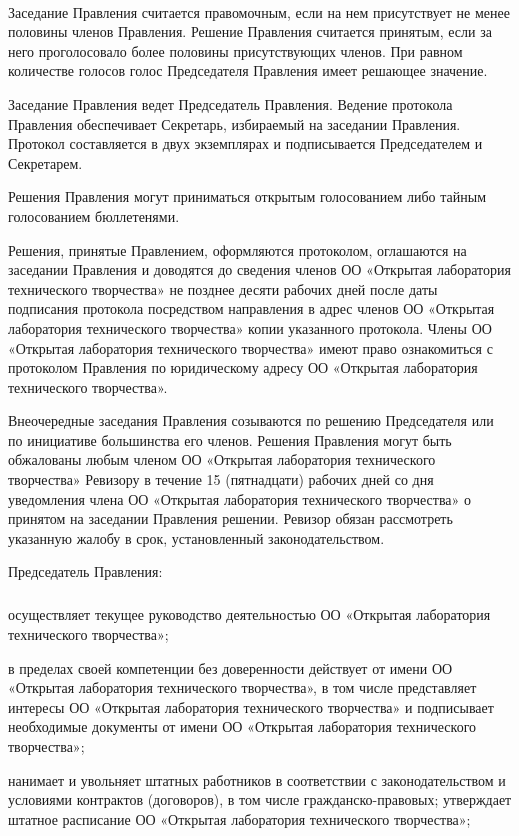 \documentclass[a4paper,fontsize=14pt,titlepage]{scrartcl}
\makeatletter
\newenvironment{numberedpars}{%
  \addtocounter{secnumdepth}{1}
  \renewcommand\theparagraph{\arabic{section}.\arabic{paragraph}}
  \renewcommand\@seccntformat[1]
  {\expandafter\ifx\csname##1\endcsname\paragraph\csname 
  the##1\endcsname\else\csname the##1\endcsname\quad\fi}
  \let\old@par=\par
  \def\new@par{\let\par=\old@par\paragraph{}\let\par=\new@par}
  \let\par=\new@par
  \par
}{
  \addtocounter{secnumdepth}{-1}
}
\newenvironment{numberedsubpars}{%
  \addtocounter{secnumdepth}{1}
  \renewcommand\thesubparagraph{\arabic{section}.\arabic{paragraph}.\arabic{subparagraph}}
  \renewcommand\@seccntformat[1]
  {\expandafter\ifx\csname##1\endcsname\subparagraph\csname 
  the##1\endcsname\else\csname the##1\endcsname\quad\fi}
  \let\old@@par=\par
  \def\new@@par{\let\par=\old@par\subparagraph{}\let\par=\new@@par}
  \let\par=\new@@par
  \par
}{
  \addtocounter{secnumdepth}{-1}
  \let\par=\old@@par
}
\makeatother
\begin{document}
\begin{numberedpars}
Заседание Правления считается правомочным, если на нем присутствует не менее половины членов Правления. Решение
Правления считается принятым, если за него проголосовало более половины присутствующих членов. При равном количестве
голосов голос Председателя Правления имеет решающее значение.

Заседание Правления ведет Председатель Правления. Ведение протокола Правления обеспечивает Секретарь, избираемый на
заседании Правления. Протокол составляется в двух экземплярах и подписывается Председателем и Секретарем. 

Решения Правления могут приниматься открытым голосованием либо тайным голосованием бюллетенями.

Решения, принятые Правлением, оформляются протоколом, оглашаются на заседании Правления и доводятся до сведения членов
ОО «Открытая лаборатория технического творчества» не позднее десяти рабочих дней после даты подписания протокола
посредством направления в адрес членов ОО «Открытая лаборатория технического творчества» копии указанного протокола.
Члены ОО «Открытая лаборатория технического творчества» имеют право ознакомиться с протоколом Правления по юридическому
адресу ОО «Открытая лаборатория технического творчества».

Внеочередные заседания Правления созываются по решению Председателя или по инициативе большинства его членов.
Решения Правления могут быть обжалованы любым членом ОО «Открытая лаборатория технического творчества» Ревизору в
течение 15 (пятнадцати) рабочих дней со дня уведомления члена ОО «Открытая лаборатория технического творчества» о
принятом на заседании Правления решении. Ревизор обязан рассмотреть указанную жалобу в срок, установленный
законодательством. 

Председатель Правления:
\begin{numberedsubpars}
осуществляет текущее руководство деятельностью ОО «Открытая лаборатория технического творчества»;

в пределах своей компетенции без доверенности действует от имени ОО «Открытая лаборатория технического творчества», в
том числе представляет интересы ОО «Открытая лаборатория технического творчества» и подписывает необходимые документы от
имени ОО «Открытая лаборатория технического творчества»;

нанимает и увольняет штатных работников в соответствии с законодательством и условиями контрактов (договоров), в том
числе гражданско-правовых; утверждает штатное расписание ОО «Открытая лаборатория технического творчества»;


\end{numberedsubpars}
\end{numberedpars}
\end{document}
